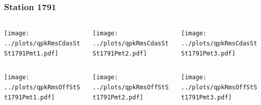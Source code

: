 \documentclass[aspectratio=169]{beamer}
\begin{document}
\begin{frame} 
  \frametitle{Station 1791}
  \begin{center}
    \begin{columns}
      \begin{column}{0.33\textwidth}
        \texttt{[image: ../plots/qpkRmsCdasStSt1791Pmt1.pdf]}
      \end{column}
      \begin{column}{0.33\textwidth}
        \texttt{[image: ../plots/qpkRmsCdasStSt1791Pmt2.pdf]}
      \end{column}
      \begin{column}{0.33\textwidth}
        \texttt{[image: ../plots/qpkRmsCdasStSt1791Pmt3.pdf]}
      \end{column}
    \end{columns}
  \end{center}

  \begin{center}
    \begin{columns}
      \begin{column}{0.33\textwidth}
        \texttt{[image: ../plots/qpkRmsOffStSt1791Pmt1.pdf]}
      \end{column}
      \begin{column}{0.33\textwidth}
        \texttt{[image: ../plots/qpkRmsOffStSt1791Pmt2.pdf]}
      \end{column}
      \begin{column}{0.33\textwidth}
        \texttt{[image: ../plots/qpkRmsOffStSt1791Pmt3.pdf]}
      \end{column}
    \end{columns}
  \end{center}
\end{frame}
\end{document}
